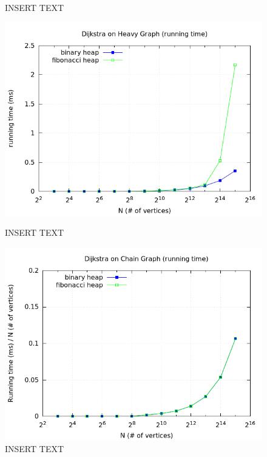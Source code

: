 \documentclass[a4paper,oneside,article,11pt]{memoir}
\begin{document}
\begin{figure}[H]
\begin{minipage}{0.48\columnwidth}
  \caption{INSERT TEXT}
  \label{fig:delmin_2_worst_branch}
\end{minipage}
\end{figure}

\begin{figure}[H]
\centering
\begin{minipage}{0.48\columnwidth}
  \centering
  \includegraphics[width=\linewidth]{../res/dijkstra/d_heavy_rt.png}%
  \caption{INSERT TEXT}
  \label{fig:delmin_2_random_branch}
\end{minipage}%
\hfill
\begin{minipage}{0.48\columnwidth}
  \centering
  \includegraphics[width=\linewidth]{../res/dijkstra/d_chain_rt_div_n.png}%
  \caption{INSERT TEXT}
  \label{fig:delmin_2_worst_branch}
\end{minipage}
\end{figure}
\end{document}
